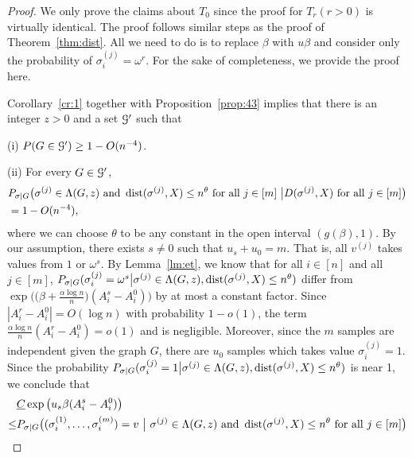 \documentclass{article}
\begin{document}
\begin{proof}

	We only prove the claims about $T_0$ since the proof for $T_r (r>0)$ is virtually identical.
	The proof follows similar steps as the proof of Theorem~\ref{thm:dist}. All we need to do is to replace $\beta$ with $u\beta$ and consider
	only the probability of $\sigma^{(j)}_i = \omega^r$. For the sake of completeness, we provide the proof here.
	
	Corollary~\ref{cr:1} together with Proposition~\ref{prop:43} implies that there is an integer $z>0$ and a set $\mathcal{G}'$ such that
	
	\noindent (i)
	$P(G\in\mathcal{G}') \ge 1- O(n^{-4})$.
	
	\noindent (ii) For every $G\in\mathcal{G}'$, 
	\begin{equation}  \label{eq:ljrc}
	\begin{aligned}
	& P_{\sigma|G} \big( \sigma^{(j)}\in  \Lambda(G, z)
	\text{~and~} \operatorname{dist}(\sigma^{(j)}, X) \le n^\theta
	\text{~for all~} j\in[m] ~\big| D(\sigma^{(j)}, X)
	\text{~for all~} j\in[m]  \big) \\
	& =1- O(n^{-4}) ,
	\end{aligned}
	\end{equation}
	where we can choose $\theta$ to be any constant in the open interval $(g(\beta), 1)$.
	By our assumption, there exists $s\neq 0$ such that
	$u_s + u_0 = m$. That is, all $v^{(j)}$ takes values from $1$ or $\omega^s$.
	By Lemma~\ref{lm:et}, we know that for all $i\in[n]$ and all $j\in[m]$,
	$P_{\sigma|G}(\sigma_i^{(j)} = \omega^s \big| \sigma^{(j)}\in \Lambda(G,z) ,\operatorname{dist}(\sigma^{(j)}, X) \le n^{\theta} )$ differ from
	$\exp\Big(\big(\beta+\frac{\alpha\log n}{n} \big) (A^s_i-A^0_i) \Big)$
	by at most a constant factor. Since $|A^r_i-A^0_i|=O(\log n)$ with probability $1-o(1)$, the term $\frac{\alpha\log n}{n}(A^r_i-A^0_i)=o(1)$ and is negligible. Moreover, since the $m$ samples are independent given the graph $G$, there are $u_0$ samples which takes value $\sigma_i^{(j)} = 1$. Since the probability
	$P_{\sigma|G}(\sigma_i^{(j)} = 1 \big| \sigma^{(j)}\in \Lambda(G,z) ,\operatorname{dist}(\sigma^{(j)}, X) \le n^{\theta} )$ is near 1, we conclude that
	\begin{align*}
	& \underline{C}
	\exp\big(u_s\beta (A^s_i-A^0_i) \big) \\
	\le
	& P_{\sigma|G} \big( (\sigma_i^{(1)},\dots,\sigma_i^{(m)})=v ~\big|~ \sigma^{(j)}\in  \Lambda(G, z)
	\text{~and~} \dist(\sigma^{(j)}, X) \le n^\theta
	\text{~for all~} j\in[m] \big) \\

\end{align*}
\end{proof}
\end{document}

